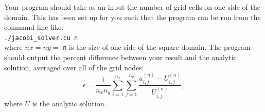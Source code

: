 \documentclass[11pt]{article}
\begin{document}
    Your program should take as an input the number of grid cells on one side of the domain.
    This has been set up for you such that the program can be run from the command line like: 
    \vspace{3mm}\\ \texttt{./jacobi\_solver.cu n} \vspace{3mm}\\
    where \(nx = ny = \) \texttt{n} is the size of one side of the square domain.
    The program should output the percent difference between your result and the analytic solution, averaged over all of the grid nodes:
    \begin{equation}
      \epsilon = \frac{1}{n_x n_y} \sum_{i=1}^{n_x} \sum_{j=1}^{n_y} \frac{u_{i,j}^{\left(n\right)} -
U_{i,j}^{\left(n\right)}}{U_{i,j}^{\left(n\right)}},
    \end{equation}
    where \(U\) is the analytic solution.
    
    \begin{solution}
        
    \end{solution}
\end{document}
